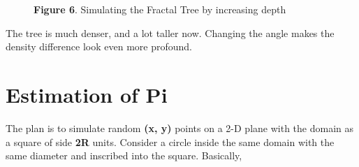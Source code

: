 \documentclass{resonance}
\begin{document}
\begin{figure}[h!]
    
    \vspace{10pt}
    \hspace{5pt}\scriptsize{\textbf{Figure 6}. \normalfont Simulating the Fractal Tree by increasing depth}
\end{figure}

\pagebreak

The tree is much denser, and a lot taller now. Changing the angle makes the density difference look even more profound.

\section{Estimation of Pi}

The plan is to simulate random \textbf{(x, y)} points on a 2-D plane with the domain as a square of side \textbf{2R} units. Consider a circle inside the same domain with the same diameter and inscribed into the square. Basically,
\end{document}
